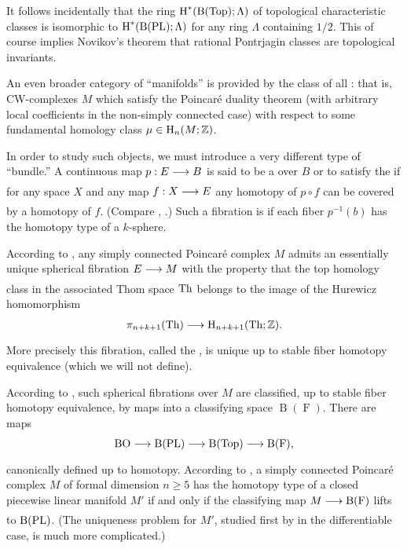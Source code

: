 \documentclass[../main]{subfiles}
\begin{document}
It follows incidentally that the ring $\operatorname{H}^\ast(\operatorname{B}(\operatorname{Top});\Lambda)$ of topological characteristic classes is isomorphic to $\operatorname{H}^\ast(\operatorname{B}(\operatorname{PL});\Lambda)$ for any ring $\Lambda$ containing $1/2$. This of course implies Novikov's theorem that rational Pontrjagin classes are topological invariants.

An even broader category of  ``manifolds'' is provided by the class of all : that is, CW-complexes $M$ which satisfy the Poincaré duality theorem (with arbitrary local coefficients in the non-simply connected case) with respect to some fundamental homology class $\mu \in \operatorname{H}_n(M;\mathbb{Z})$.

In order to study such objects, we must introduce a very different type of ``bundle.'' A continuous map $p:E \varrightarrow{} B$ is said to be a  over $B$ or to satisfy the  if for any space $X$ and any map $f:X \varrightarrow{} E$ any homotopy of $p \circ f$ can be covered by a homotopy of $f$. (Compare \cite{hurewicz}, \cite{dold1963}.) Such a fibration is  if each fiber $p^{-1}(b)$ has the homotopy type of a $k$-sphere.

According to \cite{spivak}, any simply connected Poincaré complex $M$ admits an essentially unique spherical fibration $E \varrightarrow{} M$ with the property that the top homology class in the associated Thom space $\operatorname{Th}$ belongs to the image of the Hurewicz homomorphism \[\pi_{n+k+1}(\thom) \varrightarrow{} \homology_{n+k+1}(\thom;\mathbb{Z}).\] More precisely this fibration, called the , is unique up to stable fiber homotopy equivalence (which we will not define). 

According to \cite{stasheff1963}, such spherical fibrations over $M$ are classified, up to stable fiber homotopy equivalence, by maps into a classifying space $\operatorname{B}(\operatorname{F})$. There are maps \[\BO \varrightarrow{} \operatorname{B}(\PL) \varrightarrow{} \operatorname{B}(\operatorname{Top}) \varrightarrow{} \operatorname{B}(\operatorname{F}),\]
canonically defined up to homotopy. According to \cite{browderhirsch1966}, a simply connected Poincaré complex $M$ of formal dimension $n \geq 5$ has the homotopy type of a closed piecewise linear manifold  $M'$ if and only if the classifying map $M \varrightarrow{} \operatorname{B}(\operatorname{F})$ lifts to $\operatorname{B}(\operatorname{PL})$. (The uniqueness problem for $M'$, studied first by \cite{Novikov_1967} in the differentiable case, is much more complicated.)
\end{document}
